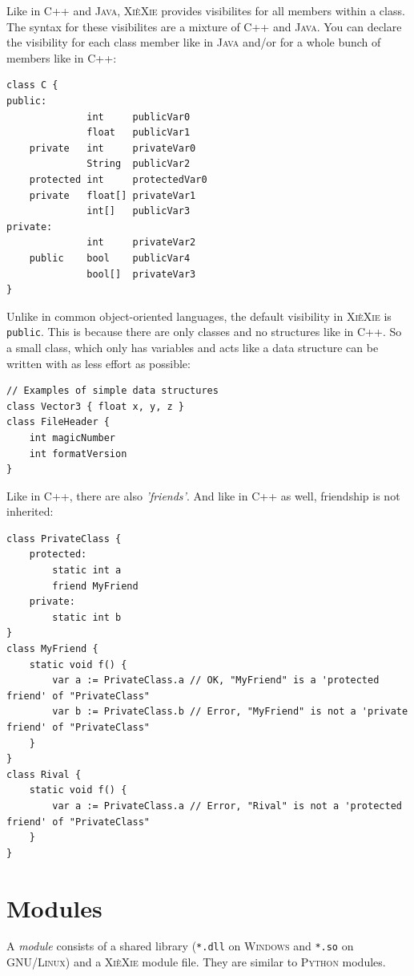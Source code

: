 \documentclass[a5paper]{report}
\def\xiexie{\textsc{Xi\`eXie}\xspace}
\def\cpp{\textsc{C++}\xspace}
\def\java{\textsc{Java}\xspace}
\def\python{\textsc{Python}\xspace}
\def\windows{\textsc{Windows}\xspace}
\def\linux{\textsc{GNU/Linux}\xspace}
\begin{document}
Like in \cpp and \java, \xiexie provides visibilites for all members within a class. The syntax for these visibilites
are a mixture of \cpp and \java. You can declare the visibility for each class member like in \java and/or for a
whole bunch of members like in \cpp:
\begin{lstlisting}
class C {
public:
              int     publicVar0
              float   publicVar1
    private   int     privateVar0
              String  publicVar2
    protected int     protectedVar0
    private   float[] privateVar1
              int[]   publicVar3
private:
              int     privateVar2
    public    bool    publicVar4
              bool[]  privateVar3
}
\end{lstlisting}
Unlike in common object-oriented languages, the default visibility in \xiexie is \texttt{public}.
This is because there are only classes and no structures like in \cpp. So a small class, which only has variables and
acts like a data structure can be written with as less effort as possible:
\begin{lstlisting}
// Examples of simple data structures
class Vector3 { float x, y, z }
class FileHeader {
    int magicNumber
    int formatVersion
}
\end{lstlisting}
Like in \cpp, there are also \textit{'friends'}. And like in \cpp as well, friendship is not inherited:
\begin{lstlisting}
class PrivateClass {
    protected:
        static int a
        friend MyFriend
    private:
        static int b
}
class MyFriend {
    static void f() {
        var a := PrivateClass.a // OK, "MyFriend" is a 'protected friend' of "PrivateClass"
        var b := PrivateClass.b // Error, "MyFriend" is not a 'private friend' of "PrivateClass"
    }
}
class Rival {
    static void f() {
        var a := PrivateClass.a // Error, "Rival" is not a 'protected friend' of "PrivateClass"
    }
}
\end{lstlisting}



\chapter{Modules}
\label{ch:modules}

A \textit{module} consists of a shared library (\texttt{*.dll} on \windows and \texttt{*.so} on \linux)
and a \xiexie module file. They are similar to \python modules.
\end{document}
